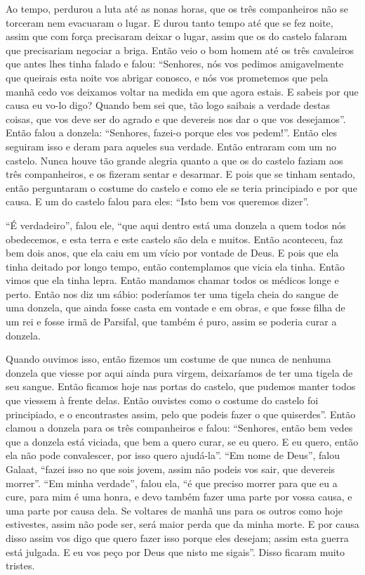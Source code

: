 Ao tempo, perdurou a luta até as nonas horas, que os três companheiros não se
torceram nem evacuaram o lugar. E durou tanto tempo até que se fez noite, assim
que com força precisaram deixar o lugar, assim que os do castelo falaram que
precisariam negociar a briga. Então veio o bom homem até os três cavaleiros que
antes lhes tinha falado e falou: “Senhores, nós vos pedimos amigavelmente que
queirais esta noite vos abrigar conosco, e nós vos prometemos que pela manhã
cedo vos deixamos voltar na medida em que agora estais. E sabeis por que causa
eu vo-lo digo? Quando bem sei que, tão logo saibais a verdade destas coisas,
que vos deve ser do agrado e que devereis nos dar o que vos desejamos”. Então
falou a donzela: “Senhores, fazei-o porque eles vos pedem!”. Então eles
seguiram isso e deram para aqueles sua verdade. Então entraram com um no
castelo. Nunca houve tão grande alegria quanto a que os do castelo faziam aos
três companheiros, e os fizeram sentar e desarmar. E pois que se tinham
sentado, então perguntaram o costume do castelo e como ele se teria principiado
e por que causa. E um do castelo falou para eles: “Isto bem vos queremos
dizer”.

“É verdadeiro”, falou ele, “que aqui dentro está uma donzela a quem todos nós
obedecemos, e esta terra e este castelo são dela e muitos. Então aconteceu, faz
bem dois anos, que ela caiu em um vício por vontade de Deus. E pois que ela
tinha deitado por longo tempo, então contemplamos que vicia ela tinha. Então
vimos que ela tinha lepra. Então mandamos chamar todos os médicos longe e
perto. Então nos diz um sábio: poderíamos ter uma tigela cheia do sangue de uma
donzela, que ainda fosse casta em vontade e em obras, e que fosse filha de um
rei e fosse irmã de Parsifal, que também é puro, assim se poderia curar a
donzela.

Quando ouvimos isso, então fizemos um costume de que nunca de nenhuma donzela
que viesse por aqui ainda pura virgem, deixaríamos de ter uma tigela de seu
sangue. Então ficamos hoje nas portas do castelo, que pudemos manter todos que
viessem à frente delas. Então ouvistes como o costume do castelo foi
principiado, e o encontrastes assim, pelo que podeis fazer o que quiserdes”.
Então clamou a donzela para os três companheiros e falou: “Senhores, então bem
vedes que a donzela está viciada, que bem a quero curar, se eu quero. E eu
quero, então ela não pode convalescer, por isso quero ajudá-la”. “Em nome de
Deus”, falou Galaat, “fazei isso no que sois jovem, assim não podeis vos sair,
que devereis morrer”. “Em minha verdade”, falou ela, “é que preciso morrer para
que eu a cure, para mim é uma honra, e devo também fazer uma parte por vossa
causa, e uma parte por causa dela. Se voltares de manhã uns para os outros como
hoje estivestes, assim não pode ser, será maior perda que da minha morte. E por
causa disso assim vos digo que quero fazer isso porque eles desejam; assim esta
guerra está julgada. E eu vos peço por Deus que nisto me sigais”. Disso ficaram
muito tristes.

